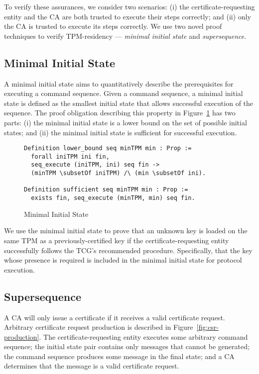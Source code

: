\documentclass[runningheads]{llncs}
\begin{document}
To verify these assurances, we consider two scenarios: (i) the
certificate-requesting entity and the CA are both trusted to execute
their steps correctly; and (ii) only the CA is trusted to execute its
steps correctly. We use two novel proof techniques to verify
TPM-residency --- \emph{minimal initial state} and
\emph{supersequence}.

\subsection{Minimal Initial State}

A minimal initial state aims to quantitatively describe the
prerequisites for executing a command sequence.  Given a command
sequence, a minimal initial state is defined as the smallest initial
state that allows successful execution of the sequence. The proof
obligation describing this property in
Figure~\ref{fig:minimal-initial-state} has two parts: (i) the minimal
initial state is a lower bound on the set of possible initial states;
and (ii) the minimal initial state is sufficient for successful
execution. 

\begin{figure}[hbtp]
\begin{lstlisting}[language=Coq]
Definition lower_bound seq minTPM min : Prop :=
  forall iniTPM ini fin,
  seq_execute (iniTPM, ini) seq fin ->
  (minTPM \subsetOf iniTPM) /\ (min \subsetOf ini).

Definition sufficient seq minTPM min : Prop :=
  exists fin, seq_execute (minTPM, min) seq fin.
\end{lstlisting}
\caption{Minimal Initial State}
\label{fig:minimal-initial-state}
\end{figure}

We use the minimal initial state to prove that an unknown key is
loaded on the same TPM as a previously-certified key if the
certificate-requesting entity successfully follows the TCG's
recommended procedure.  Specifically, that the key whose presence is
required is included in the minimal initial state for protocol
execution.

\subsection{Supersequence}

A CA will only issue a certificate if it receives a valid certificate
request.  Arbitrary certificate request production is described in
Figure~\ref{fig:csr-production}. The certificate-requesting
entity executes some arbitrary command sequence; the initial state
pair contains only messages that cannot be generated; the command
sequence produces some message in the final state; and a CA determines
that the message is a valid certificate request.
\end{document}
